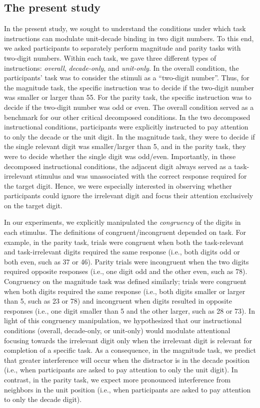 \documentclass[english,man]{apa6}
\theoremstyle{definition}
\theoremstyle{definition}
\theoremstyle{definition}
\theoremstyle{remark}
\begin{document}
\subsection{The present study}\label{the-present-study}

In the present study, we sought to understand the conditions under which
task instructions can modulate unit-decade binding in two digit numbers.
To this end, we asked participants to separately perform magnitude and
parity tasks with two-digit numbers. Within each task, we gave three
different types of instructions: \emph{overall}, \emph{decade-only}, and
\emph{unit-only}. In the overall condition, the participants' task was
to consider the stimuli as a \enquote{two-digit number}. Thus, for the
magnitude task, the specific instruction was to decide if the two-digit
number was smaller or larger than 55. For the parity task, the specific
instruction was to decide if the two-digit number was odd or even. The
overall condition served as a benchmark for our other critical
decomposed conditions. In the two decomposed instructional conditions,
participants were explicitly instructed to pay attention to only the
decade or the unit digit. In the magnitude task, they were to decide if
the single relevant digit was smaller/larger than 5, and in the parity
task, they were to decide whether the single digit was odd/even.
Importantly, in these decomposed instructional conditions, the adjacent
digit always served as a task-irrelevant stimulus and was unassociated
with the correct response required for the target digit. Hence, we were
especially interested in observing whether participants could ignore the
irrelevant digit and focus their attention exclusively on the target
digit.

In our experiments, we explicitly manipulated the \emph{congruency} of
the digits in each stimulus. The definitions of congruent/incongruent
depended on task. For example, in the parity task, trials were congruent
when both the task-relevant and task-irrelevant digits required the same
response (i.e., both digits odd or both even, such as 37 or 46). Parity
trials were incongruent when the two digits required opposite responses
(i.e., one digit odd and the other even, such as 78). Congruency on the
magnitude task was defined similarly; trials were congruent when both
digits required the same response (i.e., both digits smaller or larger
than 5, such as 23 or 78) and incongruent when digits resulted in
opposite responses (i.e., one digit smaller than 5 and the other larger,
such as 28 or 73). In light of this congruency manipulation, we
hypothesized that our instructional conditions (overall, decade-only, or
unit-only) would modulate attentional focusing towards the irrelevant
digit only when the irrelevant digit is relevant for completion of a
specific task. As a consequence, in the magnitude task, we predict that
greater interference will occur when the distractor is in the decade
position (i.e., when participants are asked to pay attention to only the
unit digit). In contrast, in the parity task, we expect more pronounced
interference from neighbors in the unit position (i.e., when
participants are asked to pay attention to only the decade digit).
\end{document}
